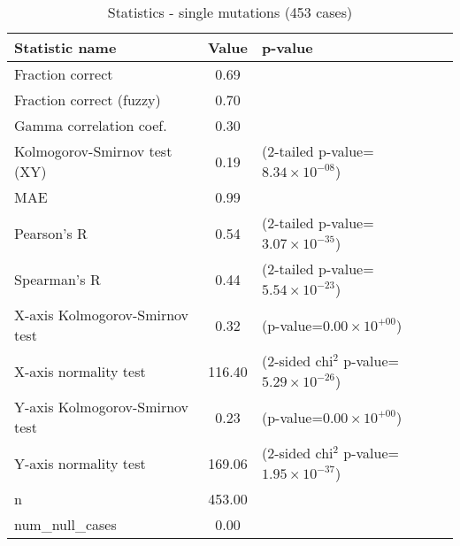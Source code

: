 \documentclass[10pt, letterpaper, oneside, titlepage, landscape]{scrreprt}
\begin{document}
\begin{table}[H]\begin{center}
\begin{tabular}{ l S[table-format=3.2] l}
Statistic name & {Value} & p-value\\
\hline
Fraction correct & 0.69 & \\
Fraction correct (fuzzy) & 0.70 & \\
Gamma correlation coef. & 0.30 & \\
Kolmogorov-Smirnov test (XY) & 0.19 & (2-tailed p-value=$8.34\times10^{-08}$)\\
MAE & 0.99 & \\
Pearson's R & 0.54 & (2-tailed p-value=$3.07\times10^{-35}$)\\
Spearman's R & 0.44 & (2-tailed p-value=$5.54\times10^{-23}$)\\
X-axis Kolmogorov-Smirnov test & 0.32 & (p-value=$0.00\times10^{+00}$)\\
X-axis normality test & 116.40 & (2-sided chi$^{2}$ p-value=$5.29\times10^{-26}$)\\
Y-axis Kolmogorov-Smirnov test & 0.23 & (p-value=$0.00\times10^{+00}$)\\
Y-axis normality test & 169.06 & (2-sided chi$^{2}$ p-value=$1.95\times10^{-37}$)\\
n & 453.00 & \\
num\_null\_cases & 0.00 & \\
\end{tabular}
\caption{Statistics - single mutations (453 cases)}
\end{center}\end{table}
\end{document}
